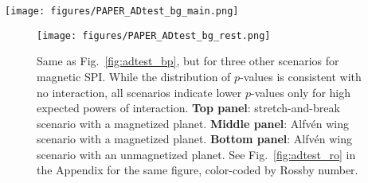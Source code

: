\documentclass[twocolumn]{aastex631}
\begin{document}
\begin{figure*}[ht!]
    \begin{centering}
        \texttt{[image: figures/PAPER\_ADtest\_bg\_main.png]}
        \caption{
            Expected power of magnetic SPI vs. AD test results, assuming the stretch-and-break scenario with an unmagnetized planet. \textcolor{red}{The vertical and horizontal grey lines denote the uncertainties quoted in Table~\ref{tab:maintable_der}.} While no individual system amounts to a $>3\sigma$ detection, the global trend is intriguing: Systems with low expected power show no deviation from random intrinsic flaring (i.e. high $p$-values). In contrast, systems with high expected power show two branches. One where the significance of interaction increases with power, and one without such a trend. See Fig.~\ref{fig:adtest_ro} in the Appendix for the same figure, color-coded by Rossby number.
        }
        \label{fig:adtest_bp}
    \end{centering}
\end{figure*}

\begin{figure}[ht!]
    \begin{centering}
        \texttt{[image: figures/PAPER\_ADtest\_bg\_rest.png]}
        \caption{
            Same as Fig.~\ref{fig:adtest_bp}, but for three other scenarios for magnetic SPI. While the distribution of $p$-values is consistent with no interaction, all scenarios indicate lower $p$-values only for high expected powers of interaction. \textbf{Top panel}: stretch-and-break scenario with a magnetized planet. \textbf{Middle panel}: Alfv\'en wing scenario with a magnetized planet. \textbf{Bottom panel}: Alfv\'en wing scenario with an unmagnetized planet. See Fig.~\ref{fig:adtest_ro} in the Appendix for the same figure, color-coded by Rossby number.
        }
        \label{fig:adtest_bp_rest}
    \end{centering}
\end{figure}

% 
\end{document}
